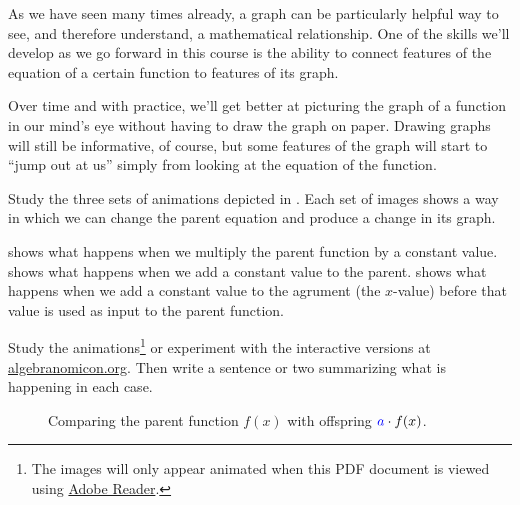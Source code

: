 As we have seen many times already, a graph can be particularly helpful way to see, and therefore understand, a mathematical relationship. One of the skills we'll develop as we go forward in this course is the ability to connect features of the equation of a certain function to features of its graph.

Over time and with practice, we'll get better at picturing the graph of a function in our mind's eye without having to draw the graph on paper. Drawing graphs will still be informative, of course, but some features of the graph will start to ``jump out at us'' simply from looking at the equation of the function.

\begin{boxexplore}
Study the three sets of animations depicted in . Each set of images shows a way in which we can change the parent equation and produce a change in its graph.

 shows what happens when we multiply the parent function by a constant value.  shows what happens when we add a constant value to the parent.  shows what happens when we add a constant value to the agrument (the $x$-value) before that value is used as input to the parent function.

Study the animations\footnote{The images will only appear animated when this PDF document is viewed using \href{http://get.adobe.com/reader/}{Adobe Reader}.} or experiment with the interactive versions at \href{http://www.algebranomicon.org/}{algebranomicon.org}. Then write a sentence or two summarizing what is happening in each case.

\end{boxexplore}

\newcommand{\animscale}{0.45}
\begin{figure}[p]
\begin{minipage}{0.32\linewidth}
	\centering
	\animategraphics[scale=\animscale]{6}{anim/linea}{}{}
\end{minipage}
%
\begin{minipage}{0.32\linewidth}
	\centering
	\animategraphics[scale=\animscale]{6}{anim/expoa}{}{}
\end{minipage}
%
\begin{minipage}{0.32\linewidth}
	\centering
	\animategraphics[scale=\animscale]{6}{anim/quada}{}{}
\end{minipage}
\caption{Comparing the parent function $f(x)$ with offspring ${\color{blue}a}\cdot f(x)$.}
\label{fig:transa}
\end{figure}


